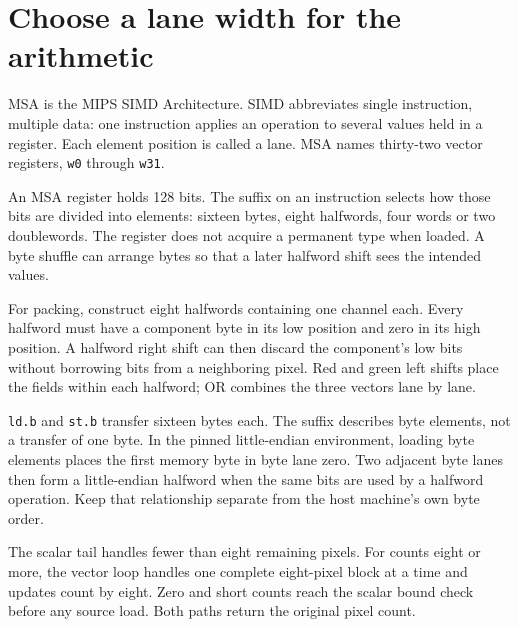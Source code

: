 \section{Choose a lane width for the arithmetic}\label{rgb-lanes}
MSA is the MIPS SIMD Architecture. SIMD abbreviates single instruction, multiple data:
one instruction applies an operation to several values held in a register. Each
element position is called a lane. MSA names thirty-two vector registers, \texttt{w0}
through \texttt{w31}.

An MSA register holds 128 bits. The suffix on an instruction selects how those bits
are divided into elements: sixteen bytes, eight halfwords, four words or two
doublewords. The register does not acquire a permanent type when loaded. A byte
shuffle can arrange bytes so that a later halfword shift sees the intended values.

For packing, construct eight halfwords containing one channel each. Every halfword
must have a component byte in its low position and zero in its high position. A
halfword right shift can then discard the component's low bits without borrowing
bits from a neighboring pixel. Red and green left shifts place the fields within
each halfword; OR combines the three vectors lane by lane.

\texttt{ld.b} and \texttt{st.b} transfer sixteen bytes each. The suffix describes
byte elements, not a transfer of one byte. In the pinned little-endian environment,
loading byte elements places the first memory byte in byte lane zero. Two adjacent
byte lanes then form a little-endian halfword when the same bits are used by a
halfword operation. Keep that relationship separate from the host machine's own
byte order.

The scalar tail handles fewer than eight remaining pixels. For counts eight or more,
the vector loop handles one complete eight-pixel block at a time and updates count
by eight. Zero and short counts reach the scalar bound check before any source load.
Both paths return the original pixel count.
